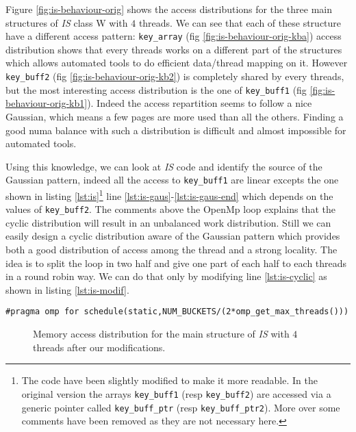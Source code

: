 Figure \ref{fig:is-behaviour-orig} shows the access distributions for the
three main structures of \emph{IS} class W with $4$ threads. We can see that
each of these structure have a different access pattern: \texttt{key\_array}
(fig \ref{fig:is-behaviour-orig-kba}) access distribution shows that every
threads works on a different part of the structures which allows automated
tools to do efficient data/thread mapping on it. However \texttt{key\_buff2}
(fig \ref{fig:is-behaviour-orig-kb2}) is completely shared by every threads,
but the most interesting access distribution is the one of \texttt{key\_buff1}
(fig \ref{fig:is-behaviour-orig-kb1}). Indeed the access repartition seems to
follow a nice Gaussian, which means a few pages are more used than all the
others. Finding a good numa balance with such a distribution is difficult and
almost impossible for automated tools.




Using this knowledge, we can look at \emph{IS} code and identify the source of the
Gaussian pattern, indeed all the access to \texttt{key\_buff1} are linear
excepts the one shown in listing \ref{lst:is}\footnote{
    The code have been slightly modified to make it more readable. In the
    original version the arrays \texttt{key\_buff1} (resp \texttt{key\_buff2})
    are accessed via a generic pointer called \texttt{key\_buff\_ptr} (resp
    \texttt{key\_buff\_ptr2}). More over some comments have been removed as
    they are not necessary here.
}  line \ref{lst:is-gaus}-\ref{lst:is-gaus-end} which depends on the values of
\texttt{key\_buff2}. The comments above the OpenMp loop explains that the
cyclic distribution will result in an unbalanced work distribution. Still we can easily design a cyclic
distribution aware of the Gaussian pattern which provides both a good
distribution of access among the thread and a strong locality. The idea is to
split the loop in two half and give one part of each half to each threads in a
round robin way. We can do that only by modifying line \ref{lst:is-cyclic} as
shown in listing \ref{lst:is-modif}.
\begin{lstlisting}[caption=One line optimization for \emph{IS}, label=lst:is-modif]
#pragma omp for schedule(static,NUM_BUCKETS/(2*omp_get_max_threads()))
\end{lstlisting}

\begin{figure}[htb]
    \centering


    \caption{Memory access distribution for the main structure of
        \emph{IS} with $4$ threads after our modifications.}
    \label{fig:is-behaviour-modif}
\end{figure}

